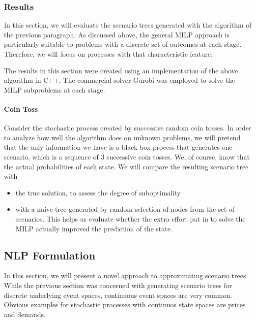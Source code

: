 \documentclass[a4paper, 12pt] {article}
\begin{document}
\subsubsection{Results}
In this section, we will evaluate the scenario trees generated with the algorithm of the previous paragraph. As discussed above, the general MILP approach is particularly suitable to problems with a discrete set of outcomes at each stage. Therefore, we will focus on processes with that characteristic feature.

The results in this section were created using an implementation of the above algorithm in C++. The commercial solver Gurobi was employed to solve the MILP subproblems at each stage.  

\paragraph{Coin Toss} Consider the stochastic process created by successive random coin tosses. In order to analyze how well the algorithm does on unknown problems, we will pretend that the only information we have is a black box process that generates one scenario, which is a sequence of 3 successive coin tosses. We, of course, know that the actual probabilities of each state. We will compare the resulting scenario tree with
\begin{itemize}
\item the true solution, to assess the degree of suboptimality
\item with a naive tree generated by random selection of nodes from the set of scenarios. This helps us evaluate whether the extra effort put in to solve the MILP actually improved the prediction of the state.
\end{itemize}
\subsection{NLP Formulation}
In this section, we will present a novel approach to approximating scenario trees. While the previous section was concerned with generating scenario trees for discrete underlying event spaces, continuous event spaces are very common. Obvious examples for stochastic processes with continuos state spaces are prices and demands.
\end{document}
